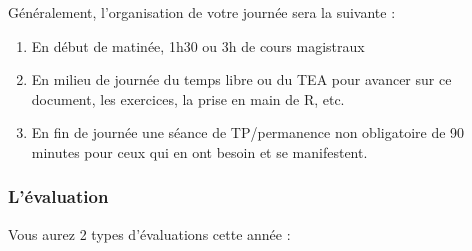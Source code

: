 \documentclass[
  a4paper,
]{article}
\providecommand{\tightlist}{%
  \setlength{\itemsep}{0pt}\setlength{\parskip}{0pt}}
\begin{document}
Généralement, l'organisation de votre journée sera la suivante :

\begin{enumerate}
\def\labelenumi{\arabic{enumi}.}
\tightlist
\item
  En début de matinée, 1h30 ou 3h de cours magistraux
\item
  En milieu de journée du temps libre ou du TEA pour avancer sur ce document, les exercices, la prise en main de R, etc.
\item
  En fin de journée une séance de TP/permanence non obligatoire de 90 minutes pour ceux qui en ont besoin et se manifestent.
\end{enumerate}

\hypertarget{luxe9valuation}{%
\subsubsection{L'évaluation}\label{luxe9valuation}}

Vous aurez 2 types d'évaluations cette année :
\end{document}
